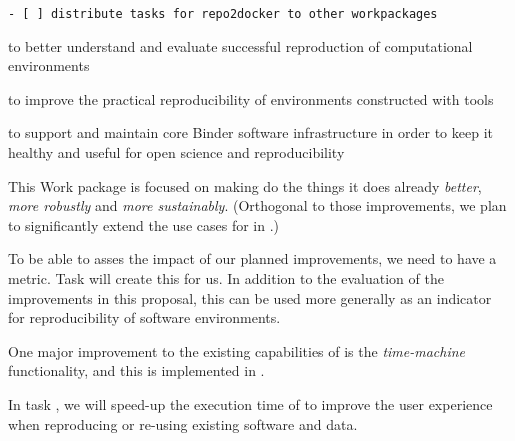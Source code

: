 \begin{draft}
\begin{verbatim}
- [ ] distribute tasks for repo2docker to other workpackages
\end{verbatim}
\end{draft}

\begin{workpackage}[
  id=reproducibility,
  wphases=0-24!1.54,
  title=Improving robustness of reproducibility tools,
  short=Robustness,
  lead=QS,
  SRLRM=23,
  UIORM=0,
  MPRM=2,
  QSRM=12,
  swsites,
]
\begin{wpobjectives}
  \begin{compactitem}
    \item to better understand and evaluate successful reproduction of computational environments
    \item to improve the practical reproducibility of environments constructed
      with \TheProject tools
    \item to support and maintain core Binder software infrastructure in order to keep it healthy
         and useful for open science and reproducibility
 \end{compactitem}
\end{wpobjectives}

\begin{wpdescription}

This Work package is focused on making \repotodocker{} do the things it does
already \emph{better}, \emph{more robustly} and \emph{more sustainably}.
(Orthogonal to those improvements, we plan to significantly extend the use cases
for \repotodocker{} in .)

To be able to asses the impact of our planned improvements, we need to have a
metric. Task  will create this
for us. In addition to the evaluation of the improvements in this proposal, this
can be used more generally as an indicator for reproducibility of software
environments.

One major improvement to the existing capabilities of \repotodocker is the
\emph{time-machine} functionality, and this is implemented in .

In task , we will speed-up the execution time of
\repotodocker{} to improve the user experience when reproducing or re-using
existing software and data.


\end{wpdescription}
\end{workpackage}
